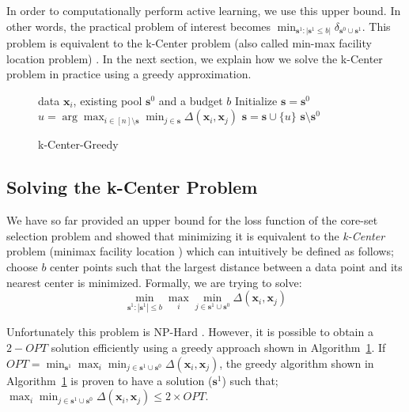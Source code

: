 \documentclass{article} %
\begin{document}
In order to computationally perform active learning, we use this upper bound. In other words, the practical problem of interest becomes $\min_{\mathbf{s}^1:|\mathbf{s}^1 \leq b|} \delta_{\mathbf{s}^0\cup \mathbf{s}^1}$. This problem is equivalent to the k-Center problem (also called min-max facility location problem) \citep{facility}. In the next section, we explain how we solve the k-Center problem in practice using a greedy approximation.{\par}

\begin{figure}
\begin{minipage}{0.44\textwidth}
\vspace{-8mm}
   \begin{algorithm}[H] 
   \caption{k-Center-Greedy} 
   \label{alg:greedy} 
   \begin{algorithmic} 
    data $\mathbf{x}_i$, existing pool $\mathbf{s}^0$ and a budget $b$ 
   \STATE Initialize $\mathbf{s}=\mathbf{s}^0$ \REPEAT \STATE $u=\arg\max_{i \in [n] \setminus \mathbf{s}} \min_{j \in \mathbf{s}} \Delta(\mathbf{x}_i, \mathbf{x}_j)$ \STATE $\mathbf{s} = \mathbf{s} \cup \{u\}$ 
    $\mathbf{s} \setminus \mathbf{s}^0$ \end{algorithmic}
\end{algorithm} 
\vspace{-10mm}
\end{minipage} 
\end{figure}  

\subsection{Solving the k-Center Problem} 
\label{sec:alg} 
We have so far provided an upper bound for the loss function of the core-set selection problem and showed that minimizing it is equivalent to the \emph{k-Center} problem (minimax facility location \citep{facility}) which can intuitively be defined as follows; choose $b$ center points such that the  largest distance between a data point and its nearest center is minimized. Formally, we are trying to solve: 
\begin{equation}
    \min_{\mathbf{s}^1:|\mathbf{s}^1| \leq b} \max_i \min_{j \in \mathbf{s}^1 \cup \mathbf{s}^0} \Delta(\mathbf{x}_i,\mathbf{x}_j)
\end{equation}

Unfortunately this problem is NP-Hard \citep{cook}. However, it is possible to obtain a $2-OPT$ solution efficiently
using a greedy approach shown in  Algorithm~\ref{alg:greedy}. If $OPT=\min_{\mathbf{s}^1} \max_i \min_{j \in
\mathbf{s}^1 \cup \mathbf{s}^0} \Delta(\mathbf{x}_i,\mathbf{x}_j)$, the greedy algorithm shown in
Algorithm~\ref{alg:greedy} is proven to have a solution ($\mathbf{s}^1$) such that; $ \max_i \min_{j \in \mathbf{s}^1
\cup \mathbf{s}^0} \Delta(\mathbf{x}_i,\mathbf{x}_j) \leq 2 \times OPT$.
\end{document}
